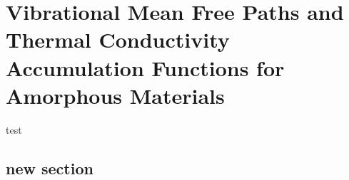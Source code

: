 \chapter{Vibrational Mean Free Paths and Thermal Conductivity Accumulation Functions for
Amorphous Materials}

test

\section{\label{mfp:Introduction}new section}



